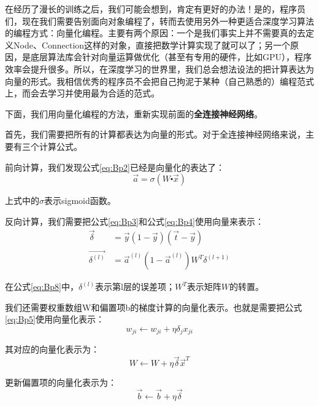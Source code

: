 在经历了漫长的训练之后，我们可能会想到，肯定有更好的办法！是的，程序员们，现在我们需要告别面向对象编程了，转而去使用另外一种更适合深度学习算法的编程方式：向量化编程。主要有两个原因：一个是我们事实上并不需要真的去定义Node、Connection这样的对象，直接把数学计算实现了就可以了；另一个原因，是底层算法库会针对向量运算做优化（甚至有专用的硬件，比如GPU），程序效率会提升很多。所以，在深度学习的世界里，我们总会想法设法的把计算表达为向量的形式。我相信优秀的程序员不会把自己拘泥于某种（自己熟悉的）编程范式上，而会去学习并使用最为合适的范式。

下面，我们用向量化编程的方法，重新实现前面的\textbf{全连接神经网络}。

首先，我们需要把所有的计算都表达为向量的形式。对于全连接神经网络来说，主要有三个计算公式。

前向计算，我们发现公式\ref{eq:Bp2}已经是向量化的表达了：
\begin{equation}
	\label{eq:Bp2_1}
	\vec{a}=\sigma(W\centerdot\vec{x})
\end{equation}

上式中的\(\sigma\)表示sigmoid函数。

反向计算，我们需要把公式\ref{eq:Bp3}和公式\ref{eq:Bp4}使用向量来表示：
\begin{align}
	\vec{\delta}       & =\vec{y}(1-\vec{y})(\vec{t}-\vec{y}) \label{eq:Bp7}             \\
	\vec{\delta^{(l)}} & =\vec{a}^{(l)}(1-\vec{a}^{(l)})W^T\delta^{(l+1)} \label{eq:Bp8}
\end{align}


在公式\ref{eq:Bp8}中，\(\delta^{(l)}\)表示第l层的误差项；\(W^T\)表示矩阵\(W\)的转置。

我们还需要权重数组W和偏置项b的梯度计算的向量化表示。也就是需要把公式\ref{eq:Bp5}使用向量化表示：
\begin{equation}
	\label{eq:Bp5_1}
	w_{ji}\gets w_{ji}+\eta\delta_jx_{ji}
\end{equation}

其对应的向量化表示为：
\begin{equation}
	\label{eq:Bp9}
	W \gets W + \eta\vec{\delta}\vec{x}^T
\end{equation}

更新偏置项的向量化表示为：
\begin{equation}
	\label{eq:Bp10}
	\vec{b} \gets \vec{b} + \eta\vec{\delta}
\end{equation}

